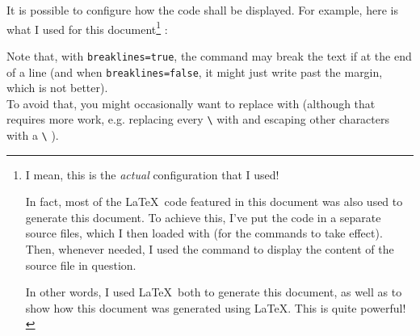It is possible to configure how the code shall be displayed.
For example, here is what I used for this document\footnote{
	I mean, this is the \emph{actual} configuration that I used!
	
	In fact, most of the \LaTeX\ code featured in this document was also used to generate this document. To achieve this, I've put the code in a separate source files, which I then loaded with  (for the commands to take effect). Then, whenever needed, I used the  command to display the content of the source file in question.
	
	In other words, I used \LaTeX\ both to generate this document, as well as to show how this document was generated using \LaTeX. This is quite powerful!
}
:


\medskip

\newpage
Note that, with \lstinline[language=tex]|breaklines=true|, the  command may break the text if at the end of a line (and when \lstinline[language=tex]|breaklines=false|, it might just write past the margin, which is not better). \\

To avoid that, you might occasionally want to replace  with  (although that requires more work, e.g. replacing every \lstinline|\| with 
and escaping other characters with a \lstinline|\| ).
